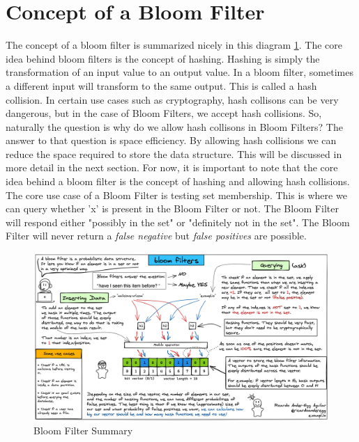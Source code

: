 \documentclass[MScCS]{uccthesis}
\begin{document}
\section{Concept of a Bloom Filter}
The concept of a bloom filter is summarized nicely in this diagram \ref{fig:bloomfilter}. The core idea behind bloom filters is the concept of hashing. Hashing is simply the transformation of an input value to an output value. In a bloom filter, sometimes a different input will transform to the same output. This is called a hash collision. In certain use cases such as cryptography, hash collisons can be very dangerous, but in the case of Bloom Filters, we accept hash collisions. So, naturally the question is why do we allow hash collisons in Bloom Filters? The answer to that question is space efficiency. By allowing hash collisions we can reduce the space required to store the data structure. This will be discussed in more detail in the next section. For now, it is important to note that the core idea behind a bloom filter is the concept of hashing and allowing hash collisions. The core use case of a Bloom Filter is testing set membership. This is where we can query whether 'x' is present in the Bloom Filter or not. The Bloom Filter will respond either "possibly in the set" or "definitely not in the set". The Bloom Filter will never return a \textit{false negative} but \textit{false positives} are possible.

\begin{figure}[h]
    \centering
    \includegraphics[width=\linewidth]{figures/bloom-filters-poster.png}
    \caption{Bloom Filter Summary}
    \label{fig:bloomfilter}
\end{figure}
\end{document}
